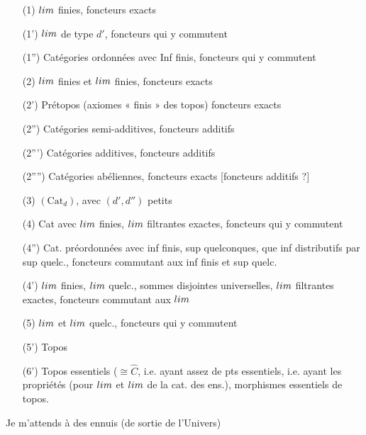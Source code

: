 \documentclass[11pt,a4paper]{article}
\begin{document}
\begin{enumerate}
  \item[(1)] $\varprojlim$ finies, foncteurs exacts
  \item[(1')] $\varprojlim$ de type $d'$, foncteurs qui y commutent
  \item[(1'')] Catégories ordonnées avec Inf finis, foncteurs
    qui y commutent
  \item[(2)] $\varinjlim$ finies et $\varprojlim$ finies, foncteurs
    exacts
  \item[(2')] Prétopos (axiomes « finis » des topos) foncteurs exacts
  \item[(2'')] Catégories semi-additives, foncteurs additifs
  \item[(2''')] Catégories additives, foncteurs additifs
  \item[(2'''')] Catégories abéliennes, foncteurs exacts [foncteurs
    additifs ?] 
  \item[(3)] $(\mathrm{Cat}_{d})$, avec $(d', d'')$ petits
  \item[(4)] Cat avec $\varprojlim$ finies, $\varinjlim$ filtrantes
    exactes, foncteurs qui y commutent 
  \item[(4'')] Cat. préordonnées avec inf finis, sup quelconques, que
    inf distributifs par sup quelc., foncteurs commutant aux inf finis
    et sup quelc.
  \item[(4')] $\varprojlim$ finies, $\varinjlim$ quelc., sommes disjointes
    universelles, $\varinjlim$ filtrantes exactes, foncteurs
     commutant aux $\varinjlim$
  \item[(5)] $\varprojlim$ et $\varinjlim$ quelc., foncteurs qui y
    commutent
  \item[(5')] Topos
  \item[(6')] Topos essentiels ($\cong \hat{C}$, i.e. ayant assez de pts
    essentiels, i.e. ayant les propriétés  (pour
    $\varinjlim$ et $\varprojlim$ de la cat. des ens.), morphismes
    essentiels de topos.
\end{enumerate}

Je m'attends à des ennuis (de sortie de l'Univers) 
\end{document}
